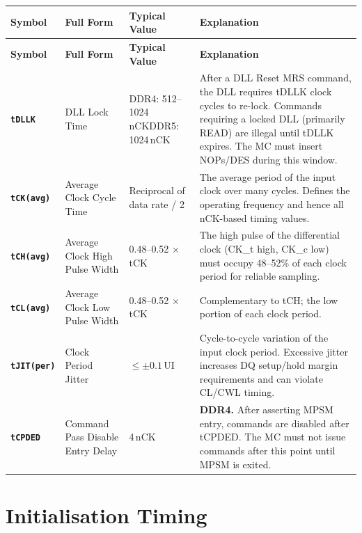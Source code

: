 \documentclass[11pt,a4paper]{article}
\newcommand{\sym}[1]{\texttt{\textbf{#1}}}
\begin{document}
\begin{longtable}{L{2.2cm} L{4.8cm} L{3.5cm} L{4cm}}
\toprule
\textbf{Symbol} & \textbf{Full Form} & \textbf{Typical Value} & \textbf{Explanation} \\
\midrule
\endfirsthead
\toprule
\textbf{Symbol} & \textbf{Full Form} & \textbf{Typical Value} & \textbf{Explanation} \\
\midrule
\endhead
\bottomrule
\endfoot

\sym{tDLLK} & DLL Lock Time & DDR4: 512--1024\,nCK\newline DDR5: 1024\,nCK &
  After a DLL Reset MRS command, the DLL requires tDLLK clock cycles to re-lock.
  Commands requiring a locked DLL (primarily READ) are illegal until tDLLK expires.
  The MC must insert NOPs/DES during this window. \\

\sym{tCK(avg)} & Average Clock Cycle Time & Reciprocal of data rate / 2 &
  The average period of the input clock over many cycles.
  Defines the operating frequency and hence all nCK-based timing values. \\

\sym{tCH(avg)} & Average Clock High Pulse Width & 0.48--0.52 $\times$ tCK &
  The high pulse of the differential clock (CK\_t high, CK\_c low) must occupy 
  48--52\% of each clock period for reliable sampling. \\

\sym{tCL(avg)} & Average Clock Low Pulse Width & 0.48--0.52 $\times$ tCK &
  Complementary to tCH; the low portion of each clock period. \\

\sym{tJIT(per)} & Clock Period Jitter & $\leq \pm 0.1\,\text{UI}$ &
  Cycle-to-cycle variation of the input clock period. Excessive jitter increases 
  DQ setup/hold margin requirements and can violate CL/CWL timing. \\

\sym{tCPDED} & Command Pass Disable Entry Delay & 4\,nCK &
  \textbf{DDR4.} After asserting MPSM entry, commands are disabled after tCPDED.
  The MC must not issue commands after this point until MPSM is exited. \\
\end{longtable}

\section{Initialisation Timing}
\end{document}
